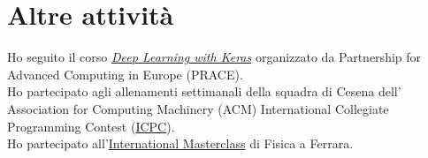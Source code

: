 \documentclass[curriculum-vitae-ita]{subfiles}
\begin{document}
	\section*{Altre attività}
		 Ho seguito il corso \href{https://prace-indico.niif.hu/event/1336/overview}{\textit{Deep Learning with Keras}} organizzato da Partnership for Advanced Computing in Europe (PRACE).\\
	
		 Ho partecipato agli allenamenti settimanali della squadra di Cesena dell' Association for Computing Machinery (ACM) International Collegiate Programming Contest (\href{https://icpc.global}{ICPC}).\\
		
		 Ho partecipato all'\href{https://physicsmasterclasses.org}{International Masterclass} di Fisica a Ferrara.
	
\end{document}
